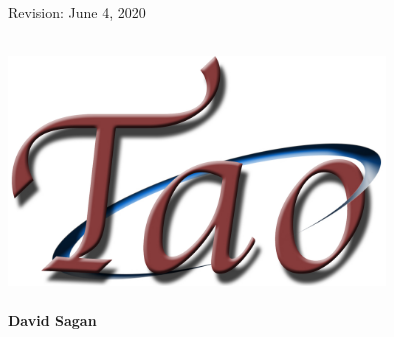 \thispagestyle{empty}

\begin{flushright}
\large
Revision: June 4, 2020 \\
\end{flushright}

\vfill


{
\begin{center}
 \\
\vskip 0.2in
\includegraphics[width=10cm]{tao-logo.pdf} \\
\vskip 0.3in
 \\
\vskip 0.4in
{\huge \sf\bf David Sagan} \\
\end{center}
}

\vfill
\break
